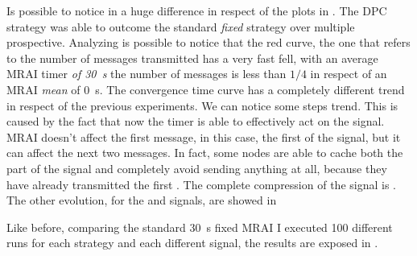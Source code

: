 Is possible to notice in  a huge difference
in respect of the plots in .
The \ac{DPC} strategy was able to outcome the standard \textit{fixed} strategy
over multiple prospective.
Analyzing  is possible to notice that
the red curve, the one that refers to the number of messages transmitted has
a very fast fell, with an average \ac{MRAI} timer \textit{of \SI{30}{\second}}
the number of messages is less than $1/4$ in respect of an \ac{MRAI} \textit{mean}
of \SI{0}{\second}.
The convergence time curve has a completely different trend in respect of the
previous experiments.
We can notice some steps trend.
This is caused by the fact that now the timer is able to effectively act on the signal.
\ac{MRAI} doesn't affect the first message, in this case, the first  of the
signal, but it can affect the next two messages.
In fact, some nodes are able to cache both the  part of the signal and
completely avoid sending anything at all, because they have already transmitted
the first .
The complete compression of the signal  is .
The other evolution, for the  and  signals, are showed in 

Like before, comparing the standard \SI{30}{\second} fixed \ac{MRAI} I executed
\num{100} different runs for each strategy and each different signal, the results
are exposed in .

